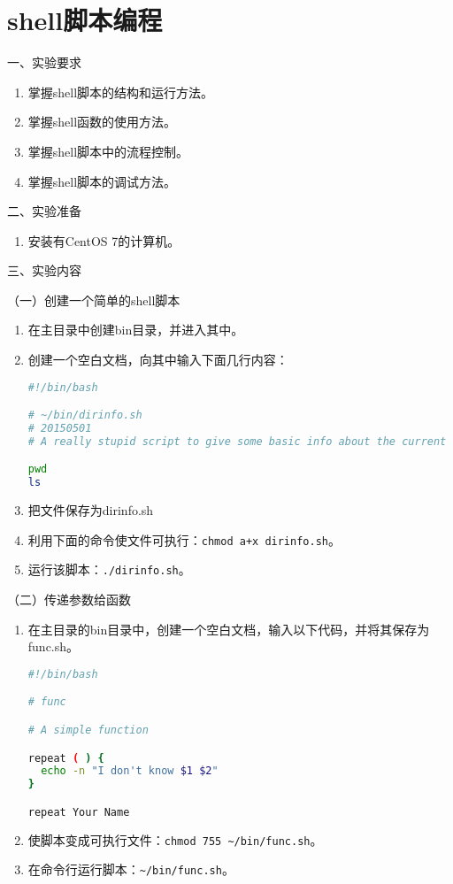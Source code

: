 \chapter{shell脚本编程}

\noindent
一、实验要求
\begin{enumerate}
  \item 掌握shell脚本的结构和运行方法。
  \item 掌握shell函数的使用方法。
  \item 掌握shell脚本中的流程控制。
  \item 掌握shell脚本的调试方法。
\end{enumerate}

\vspace{0.2in}
\noindent
二、实验准备
\begin{enumerate}
  \item 安装有CentOS 7的计算机。
\end{enumerate}

\vspace{0.2in}
\noindent
三、实验内容

\vspace{0.1in}
（一）创建一个简单的shell脚本
\begin{enumerate}
  \item 在主目录中创建bin目录，并进入其中。
  \item 创建一个空白文档，向其中输入下面几行内容：
\begin{lstlisting}[language=bash]
#!/bin/bash

# ~/bin/dirinfo.sh
# 20150501
# A really stupid script to give some basic info about the current directory

pwd
ls
\end{lstlisting}
  \item 把文件保存为dirinfo.sh
  \item 利用下面的命令使文件可执行：\verb|chmod a+x dirinfo.sh|。
  \item 运行该脚本：\verb|./dirinfo.sh|。
\end{enumerate}

\vspace{0.1in}
（二）传递参数给函数
\begin{enumerate}
  \item 在主目录的bin目录中，创建一个空白文档，输入以下代码，并将其保存为func.sh。
\begin{lstlisting}[language=bash]
#!/bin/bash

# func

# A simple function

repeat ( ) {
  echo -n "I don't know $1 $2"
}

repeat Your Name
\end{lstlisting}
  \item 使脚本变成可执行文件：\verb|chmod 755 ~/bin/func.sh|。
  \item 在命令行运行脚本：\verb|~/bin/func.sh|。
\end{enumerate}

